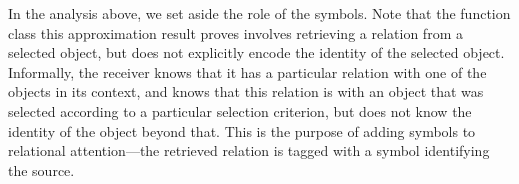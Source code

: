 In the analysis above, we set aside the role of the symbols. Note that the function class this approximation result proves involves retrieving a relation from a selected object, but does not explicitly encode the identity of the selected object. Informally, the receiver knows that it has a particular relation with one of the objects in its context, and knows that this relation is with an object that was selected according to a particular selection criterion, but does not know the identity of the object beyond that. This is the purpose of adding symbols to relational attention---the retrieved relation is tagged with a symbol identifying the source.
